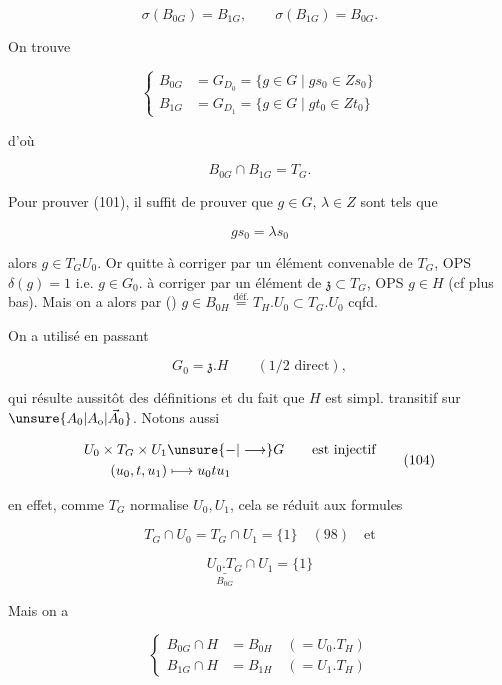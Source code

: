 \[\sigma(B_{0G})=B_{1G},\qquad \sigma(B_{1G})=B_{0G}.\tag*{(100)}\]

On trouve

\[\left\{\begin{aligned}
B_{0G}&=G_{D_0}=\{g\in G\mid gs_0\in Zs_0\}\\
B_{1G}&=G_{D_1}=\{g\in G\mid gt_0\in Zt_0\}
\end{aligned}\right.\tag*{(101)}\]

d'où

\[B_{0G}\cap B_{1G}=T_G.\tag*{(102)}\]

Pour prouver (101), il suffit de prouver que  $g\in G$,  $\lambda\in Z$ sont tels que

\[gs_0=\lambda s_0\]

alors $g\in T_G U_0$. Or quitte à corriger  par un élément convenable de $T_G$, OPS $\delta(g)=1$ i.e. $g\in G_0$.   à corriger par un élément de $\mathfrak{z}\subset T_G$, OPS $g\in H$ (cf plus bas). Mais on a alors par () $g\in B_{0H}\overset{\mathrm{déf}.}{=}T_H.U_0\subset T_G.U_0$ cqfd.

On a utilisé en passant

\[G_0=\mathfrak{z}.H\qquad (1/2\text{ direct}),\tag*{(103)}\]


qui résulte aussitôt des définitions et du fait que $H$ est simpl. transitif sur $\unsure{A_0|A_{\mathrm{o}}|\vec{A}_0}$. Notons aussi

\[\begin{aligned}
U_0\times T_G\times U_1&\unsure{-|\longrightarrow}G\qquad\text{est injectif}\\
(u_0,t,u_1)&\longmapsto u_0tu_1
\end{aligned}\tag*{(104)}\]

en effet, comme $T_G$ normalise $U_0,U_1$, cela se réduit aux formules

\[T_G\cap U_0=T_G\cap U_1=\{1\}\quad(98)\quad\text{et}\]

\[\underset{B_{0G}}{\underline{U_0.T_G}}\cap U_1=\{1\}\tag*{(*)}\]

Mais on a

\[\left\{\begin{aligned}
B_{0G}\cap H&=B_{0H}\quad(=U_0.T_H)\\
B_{1G}\cap H&=B_{1H}\quad(=U_1.T_H)
\end{aligned}\right.\tag*{(105)}\]

